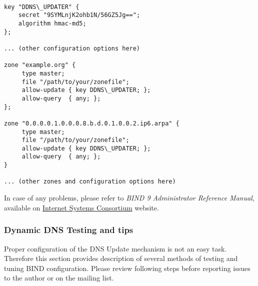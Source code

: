 \begin{lstlisting}

key "DDNS\_UPDATER" {
    secret "9SYMLnjK2ohb1N/56GZ5Jg==";
    algorithm hmac-md5;
};

... (other configuration options here)

zone "example.org" {
     type master;
     file "/path/to/your/zonefile";
     allow-update { key DDNS\_UPDATER; };
     allow-query  { any; };
};

zone "0.0.0.0.1.0.0.0.8.b.d.0.1.0.0.2.ip6.arpa" {
     type master;
     file "/path/to/your/zonefile";
     allow-update { key DDNS\_UPDATER; };
     allow-query  { any; };
}

... (other zones and configuration options here)
\end{lstlisting}

In case of any problems, please refer to \emph{BIND 9 Administrator
Reference Manual}, available
on \href{http://www.isc.org/software/bind}{Internet Systems
Consortium} website.

\subsubsection{Dynamic DNS Testing and tips}
Proper configuration of the DNS Update mechanism is not an easy
task. Therefore this section provides description of several methods of
testing and tuning BIND configuration. Please review following steps
before reporting issues to the author or on the mailing list.

